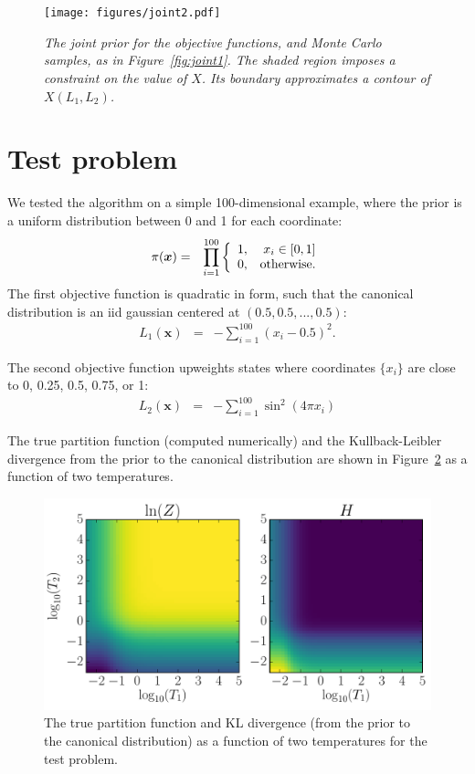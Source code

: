 \documentclass[journal,article,accept,moreauthors,pdftex,12pt,a4paper]{mdpi}
\newcommand{\xx}{\boldsymbol{x}}
\begin{document}

\begin{figure}
\centering
\texttt{[image: figures/joint2.pdf]}
\caption{\it The joint prior for the objective functions, and Monte Carlo
samples, as in Figure~\ref{fig:joint1}. The shaded region imposes a
constraint on the value of $\hat{X}$. Its boundary approximates a contour
of $X(L_1, L_2)$.
\label{fig:joint2}}
\end{figure}




\section{Test problem}

We tested the algorithm on a simple 100-dimensional example, where the
prior is a uniform distribution between 0 and 1 for each coordinate:
\begin{eqnarray}
\pi(\xx) &=& \prod_{i=1}^{100}
\left\{
\begin{array}{lr}
1, & x_i \in [0, 1]\\
0, & \textnormal{otherwise.}
\end{array}
\right.
\end{eqnarray}
The first objective function is quadratic in form, such that the canonical
distribution is an iid gaussian centered at $(0.5, 0.5, ..., 0.5)$:
\begin{eqnarray}
L_1(\xx) &=& -\sum_{i=1}^{100} \left(x_i - 0.5\right)^2.
\end{eqnarray}

The second objective function upweights states where coordinates $\{x_i\}$
are close to 0, 0.25, 0.5, 0.75, or 1:
\begin{eqnarray} 
L_2(\xx) &=& -\sum_{i=1}^{100} \sin^2(4\pi x_i)
\end{eqnarray}

The true partition function (computed numerically) and the Kullback-Leibler
divergence from the prior to the canonical distribution are shown in
Figure~\ref{fig:truth} as a function of two temperatures.

\begin{figure}
\centering
\includegraphics[scale=0.75]{figures/truth.pdf}
\caption{The true partition function and KL divergence (from the prior to
the canonical distribution) as a function of two temperatures for the
test problem.\label{fig:truth}}
\end{figure}
\end{document}
